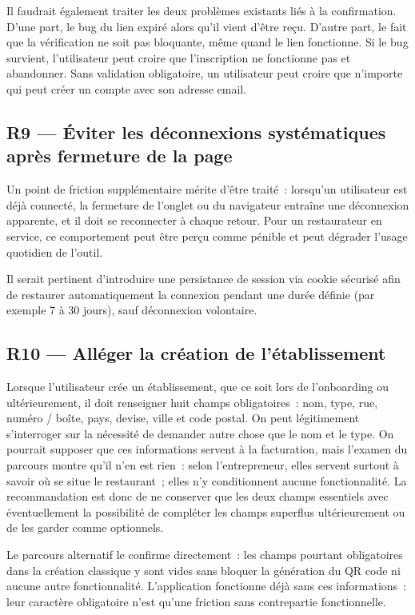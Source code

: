 \documentclass[12pt, a4paper]{article}
\begin{document}
Il faudrait également traiter les deux problèmes existants liés à la confirmation. D'une part,
le bug du lien expiré alors qu'il vient d'être reçu.
D'autre part, le fait que la vérification ne soit pas bloquante, même quand le lien fonctionne.
Si le bug survient, l'utilisateur peut croire que l'inscription ne fonctionne pas et abandonner.
Sans validation obligatoire, un utilisateur peut croire que n'importe qui peut créer un compte avec son adresse email.

\subsection{R9 — Éviter les déconnexions systématiques après fermeture de la page}

Un point de friction supplémentaire mérite d'être traité~: lorsqu'un utilisateur est déjà
connecté, la fermeture de l'onglet ou du navigateur entraîne une déconnexion apparente, et
il doit se reconnecter à chaque retour. Pour un restaurateur en service, ce comportement peut 
être perçu comme pénible et peut dégrader l'usage quotidien de l'outil.

Il serait pertinent d'introduire une persistance de session via cookie sécurisé afin de
restaurer automatiquement la connexion pendant une durée définie (par exemple 7 à 30 jours),
sauf déconnexion volontaire.

\subsection{R10 — Alléger la création de l'établissement}

Lorsque l'utilisateur crée un établissement, que ce soit lors de l'onboarding ou
ultérieurement, il doit renseigner huit champs obligatoires~: nom, type, rue, numéro /
boîte, pays, devise, ville et code postal. On peut légitimement s'interroger sur la
nécessité de demander autre chose que le nom et le type. On pourrait supposer que ces
informations servent à la facturation, mais l'examen du parcours montre qu'il n'en est
rien~: selon l'entrepreneur, elles servent surtout à savoir où se situe le restaurant~;
elles n'y conditionnent aucune fonctionnalité. La recommandation est
donc de ne conserver que les deux champs essentiels avec éventuellement la possibilité
de compléter les champs superflus ultérieurement ou de les garder comme optionnels.

Le parcours alternatif le confirme directement~: les champs pourtant obligatoires dans la
création classique y sont vides sans bloquer la génération du QR code ni aucune autre
fonctionnalité. L'application fonctionne déjà sans ces informations~: leur caractère obligatoire
n'est qu'une friction sans contrepartie fonctionnelle.
\end{document}
